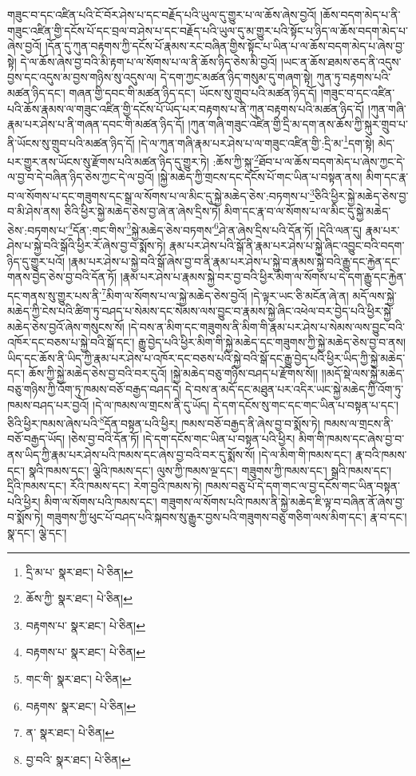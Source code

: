 གཟུང་བ་དང་འཛིན་པའི་ངོ་བོར་ཤེས་པ་དང་བརྗོད་པའི་ཡུལ་དུ་གྱུར་པ་ལ་ཆོས་ཞེས་བྱའོ། །ཆོས་བདག་མེད་པ་ནི་གཟུང་འཛིན་གྱི་དངོས་པོ་དང་བྲལ་བ་ཤེས་པ་དང་བརྗོད་པའི་ཡུལ་དུ་མ་གྱུར་པའི་སྟོང་པ་ཉིད་ལ་ཆོས་བདག་མེད་པ་ཞེས་བྱའོ། །དོན་དུ་ཀུན་བརྟགས་ཀྱི་དངོས་པོ་རྣམས་རང་བཞིན་གྱིས་སྟོང་པ་ཡིན་པ་ལ་ཆོས་བདག་མེད་པ་ཞེས་བྱ་སྟེ། དེ་ལ་ཆོས་ཞེས་བྱ་བའི་མི་རྟག་པ་ལ་སོགས་པ་ལ་ནི་ཆོས་ཉིད་ཅེས་མི་བྱའོ། །ཡང་ན་ཆོས་ཐམས་ཅད་ནི་འདུས་བྱས་དང་འདུས་མ་བྱས་གཉིས་སུ་འདུས་ལ། དེ་དག་ཀྱང་མཚན་ཉིད་གསུམ་དུ་གཞག་སྟེ། ཀུན་ཏུ་བརྟགས་པའི་མཚན་ཉིད་དང་། གཞན་གྱི་དབང་གི་མཚན་ཉིད་དང་། ཡོངས་སུ་གྲུབ་པའི་མཚན་ཉིད་དོ། །གཟུང་བ་དང་འཛིན་པའི་ཆོས་རྣམས་ལ་གཟུང་འཛིན་གྱི་དངོས་པོ་ཡོད་པར་བརྟགས་པ་ནི་ཀུན་བརྟགས་པའི་མཚན་ཉིད་དོ། །ཀུན་གཞི་རྣམ་པར་ཤེས་པ་ནི་གཞན་དབང་གི་མཚན་ཉིད་དོ། །ཀུན་གཞི་གཟུང་འཛིན་གྱི་དྲི་མ་དག་ནས་ཆོས་ཀྱི་སྐུར་གྲུབ་པ་ནི་ཡོངས་སུ་གྲུབ་པའི་མཚན་ཉིད་དོ། །དེ་ལ་ཀུན་གཞི་རྣམ་པར་ཤེས་པ་ལ་གཟུང་འཛིན་གྱི་:དྲི་མ་\footnote{དྲི་མ་པ་  སྣར་ཐང་།  པེ་ཅིན། }དག་སྟེ། མེད་པར་གྱུར་ནས་ཡོངས་སུ་རྫོགས་པའི་མཚན་ཉིད་དུ་གྱུར་ཏེ། :ཆོས་ཀྱི་སྐུ་\footnote{ཆོས་ཀྱི་  སྣར་ཐང་།  པེ་ཅིན། }ཐོབ་པ་ལ་ཆོས་བདག་མེད་པ་ཞེས་ཀྱང་དེ་ལ་བྱ་བ་དེ་བཞིན་ཉིད་ཅེས་ཀྱང་དེ་ལ་བྱའོ། །སྐྱེ་མཆེད་ཀྱི་གྲངས་དང་དངོས་པོ་གང་ཡིན་པ་བསྟན་ནས། མིག་དང་རྣ་བ་ལ་སོགས་པ་དང་གཟུགས་དང་སྒྲ་ལ་སོགས་པ་ལ་མིང་དུ་སྐྱེ་མཆེད་ཅེས་:བཏགས་པ་\footnote{བརྟགས་པ་  སྣར་ཐང་།  པེ་ཅིན། }ཅིའི་ཕྱིར་སྐྱེ་མཆེད་ཅེས་བྱ་བ་མི་ཤེས་ནས། ཅིའི་ཕྱིར་སྐྱེ་མཆེད་ཅེས་བྱ་ཞེ་ན་ཞེས་དྲིས་ཏེ། མིག་དང་རྣ་བ་ལ་སོགས་པ་ལ་མིང་དུ་སྐྱེ་མཆེད་ཅེས་:བཏགས་པ་\footnote{བརྟགས་པ་  སྣར་ཐང་།  པེ་ཅིན། }དོན་:གང་གིས་\footnote{གང་གི་  སྣར་ཐང་།  པེ་ཅིན། }སྐྱེ་མཆེད་ཅེས་བཏགས་\footnote{བརྟགས་  སྣར་ཐང་།  པེ་ཅིན། }ཤེ་ན་ཞེས་དྲིས་པའི་དོན་ཏོ། །དེའི་ལན་དུ། རྣམ་པར་ཤེས་པ་སྐྱེ་བའི་སྒོའི་ཕྱིར་རོ་ཞེས་བྱ་བ་སྨོས་ཏེ། རྣམ་པར་ཤེས་པའི་སྒོ་ནི་རྣམ་པར་ཤེས་པ་སྐྱེ་ཞིང་འབྱུང་བའི་བདག་ཉིད་དུ་གྱུར་པའོ། །རྣམ་པར་ཤེས་པ་སྐྱེ་བའི་སྒོ་ཞེས་བྱ་བ་ནི་རྣམ་པར་ཤེས་པ་སྐྱེ་བ་རྣམས་སྐྱེ་བའི་རྒྱུ་དང་རྐྱེན་དང་གནས་བྱེད་ཅེས་བྱ་བའི་དོན་ཏོ། །རྣམ་པར་ཤེས་པ་རྣམས་སྐྱེ་བར་བྱ་བའི་ཕྱིར་མིག་ལ་སོགས་པ་དེ་དག་རྒྱུ་དང་རྐྱེན་དང་གནས་སུ་གྱུར་པས་ནི་\footnote{ན་  སྣར་ཐང་།  པེ་ཅིན། }མིག་ལ་སོགས་པ་ལ་སྐྱེ་མཆེད་ཅེས་བྱའོ། །དེ་ལྟར་ཡང་ཅི་མངོན་ཞེ་ན། མདོ་ལས་སྐྱེ་མཆེད་ཀྱི་ངེས་པའི་ཚིག་ཏུ་བཤད་པ་སེམས་དང་སེམས་ལས་བྱུང་བ་རྣམས་སྐྱེ་ཞིང་འཕེལ་བར་བྱེད་པའི་ཕྱིར་སྐྱེ་མཆེད་ཅེས་བྱའོ་ཞེས་གསུངས་སོ། །དེ་བས་ན་མིག་དང་གཟུགས་ནི་མིག་གི་རྣམ་པར་ཤེས་པ་སེམས་ལས་བྱུང་བའི་འཁོར་དང་བཅས་པ་སྐྱེ་བའི་སྒོ་དང་། རྒྱུ་བྱེད་པའི་ཕྱིར་མིག་གི་སྐྱེ་མཆེད་དང་གཟུགས་ཀྱི་སྐྱེ་མཆེད་ཅེས་བྱ་བ་ནས། ཡིད་དང་ཆོས་ནི་ཡིད་ཀྱི་རྣམ་པར་ཤེས་པ་འཁོར་དང་བཅས་པའི་སྐྱེ་བའི་སྒོ་དང་རྒྱུ་བྱེད་པའི་ཕྱིར་ཡིད་ཀྱི་སྐྱེ་མཆེད་དང་། ཆོས་ཀྱི་སྐྱེ་མཆེད་ཅེས་བྱ་བའི་བར་དུའོ། །སྐྱེ་མཆེད་བཅུ་གཉིས་བཤད་པ་རྫོགས་སོ།། །།མདོ་སྡེ་ལས་སྐྱེ་མཆེད་བཅུ་གཉིས་ཀྱི་འོག་ཏུ་ཁམས་བཅོ་བརྒྱད་བཤད་དེ། དེ་བས་ན་མདོ་དང་མཐུན་པར་འདིར་ཡང་སྐྱེ་མཆེད་ཀྱི་འོག་ཏུ་ཁམས་བཤད་པར་བྱའོ། །དེ་ལ་ཁམས་ལ་གྲངས་ནི་དུ་ཡོད། དེ་དག་དངོས་སུ་གང་དང་གང་ཡིན་པ་བསྟན་པ་དང་། ཅིའི་ཕྱིར་ཁམས་ཞེས་པའི་\footnote{བྱ་བའི་  སྣར་ཐང་།  པེ་ཅིན། }དོན་བསྟན་པའི་ཕྱིར། ཁམས་བཅོ་བརྒྱད་ནི་ཞེས་བྱ་བ་སྨོས་ཏེ། ཁམས་ལ་གྲངས་ནི་བཅོ་བརྒྱད་ཡོད། །ཅེས་བྱ་བའི་དོན་ཏོ། །དེ་དག་དངོས་གང་ཡིན་པ་བསྟན་པའི་ཕྱིར། མིག་གི་ཁམས་དང་ཞེས་བྱ་བ་ནས་ཡིད་ཀྱི་རྣམ་པར་ཤེས་པའི་ཁམས་དང་ཞེས་བྱ་བའི་བར་དུ་སྨོས་སོ། །དེ་ལ་མིག་གི་ཁམས་དང་། རྣ་བའི་ཁམས་དང་། སྣའི་ཁམས་དང་། ལྕེའི་ཁམས་དང་། ལུས་ཀྱི་ཁམས་ལྔ་དང་། གཟུགས་ཀྱི་ཁམས་དང་། སྒྲའི་ཁམས་དང་། དྲིའི་ཁམས་དང་། རོའི་ཁམས་དང་། རེག་བྱའི་ཁམས་ཏེ། ཁམས་བཅུ་པོ་དེ་དག་གང་ལ་བྱ་དངོས་གང་ཡིན་བསྟན་པའི་ཕྱིར། མིག་ལ་སོགས་པའི་ཁམས་དང་། གཟུགས་ལ་སོགས་པའི་ཁམས་ནི་སྐྱེ་མཆེད་ཇི་ལྟ་བ་བཞིན་ནོ་ཞེས་བྱ་བ་སྨོས་ཏེ། གཟུགས་ཀྱི་ཕུང་པོ་བཤད་པའི་སྐབས་སུ་རྒྱུར་བྱས་པའི་གཟུགས་བཅུ་གཅིག་ལས་མིག་དང་། རྣ་བ་དང་། སྣ་དང་། ལྕེ་དང་། 